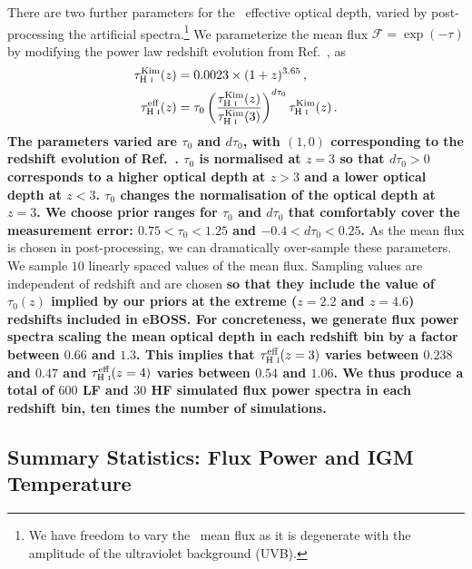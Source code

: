 There are two further parameters for the \Lya~effective optical depth, varied by post-processing the artificial spectra.\footnote{We have freedom to vary the \Lya~mean flux as it is degenerate with the amplitude of the ultraviolet background (UVB).}
We parameterize the mean flux $\mathcal{F} = \exp(-\tau)$ by modifying the power law redshift evolution from Ref.~\cite{2007MNRAS.382.1657K}, as
\begin{align}
\tau^{\text{Kim}}_{\text{H~{\sc i}}}(z) &= 0.0023 \times (1+z)^{3.65}\,, \\
\tau^{\text{eff}}_{\text{H~{\sc i}}}(z) &= \tau_0 \left(\frac{\tau^{\text{Kim}}_{\text{H~{\sc i}}}(z)}{\tau^{\text{Kim}}_{\text{H~{\sc i}}}(3)}\right)^{d\tau_0} \tau^{\text{Kim}}_{\text{H~{\sc i}}}(z)\,.
 \label{eq:meanflux}
\end{align}
\textbf{The parameters varied are $\tau_0$ and $d\tau_0$, with $(1, 0)$ corresponding to the redshift evolution of Ref.~\cite{2007MNRAS.382.1657K}. $\tau_0$ is normalised at $z=3$ so that $d\tau_0 > 0$ corresponds to a higher optical depth at $z > 3$ and a lower optical depth at $z < 3$. $\tau_0$ changes the normalisation of the optical depth at $z=3$. We choose prior ranges for $\tau_0$ and $d\tau_0$ that comfortably cover the measurement error: $0.75 < \tau_0 < 1.25$ and $-0.4 < d\tau_0 < 0.25$.}
As the mean flux is chosen in post-processing, we can dramatically over-sample these parameters. We sample $10$ linearly spaced values of the mean flux. Sampling values are independent of redshift and are chosen \textbf{so that they include the value of $\tau_0(z)$ implied by our priors at the extreme ($z=2.2$ and $z=4.6$) redshifts included in eBOSS. For concreteness, we generate flux power spectra scaling the mean optical depth in each redshift bin by a factor between $0.66$ and $1.3$. This implies that $\tau^{\text{eff}}_{\text{H~{\sc i}}}(z=3)$ varies between $ 0.238$ and $0.47$ and $\tau^{\text{eff}}_{\text{H~{\sc i}}}(z=4)$ varies between $0.54$ and $1.06$. We thus produce a total of $600$ LF and $30$ HF simulated flux power spectra in each redshift bin, ten times the number of simulations.}


\subsection{Summary Statistics: Flux Power and IGM Temperature}\label{sec:sim_fps}

